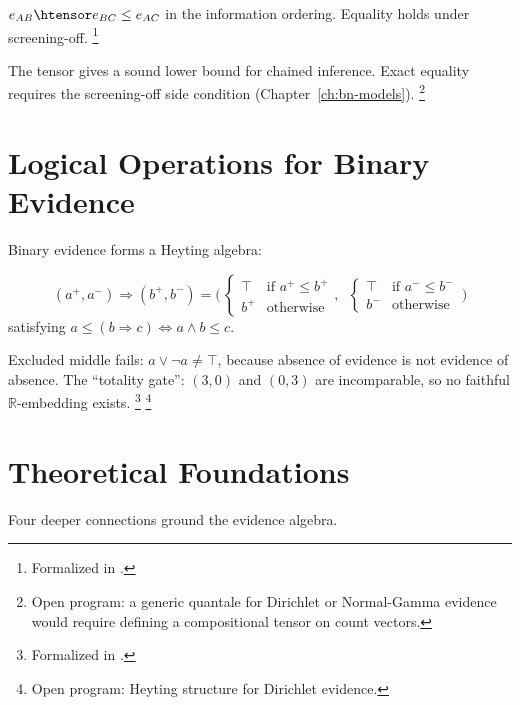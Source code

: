 \documentclass[11pt,openany]{report}
\begin{document}
\begin{theorem}
\label{thm:quantale-trans}
$e_{AB} \htensor e_{BC} \le e_{AC}$ in the information ordering.
Equality holds under screening-off.%
\footnote{Formalized in
.}
\end{theorem}

\noindent
The tensor gives a sound lower bound for chained inference.  Exact
equality requires the screening-off side condition
(Chapter~\ref{ch:bn-models}).%
\footnote{Open program: a generic quantale for Dirichlet or
Normal-Gamma evidence would require defining a compositional tensor
on count vectors.}


\section{Logical Operations for Binary Evidence}
\label{sec:binary-heyting}

Binary evidence forms a Heyting algebra:

\begin{definition}
\[
  (a^+, a^-) \Rightarrow (b^+, b^-) =
  \Big(\,\begin{cases} \top & \text{if } a^+ \le b^+ \\
                        b^+ & \text{otherwise}\end{cases},\;\;
        \begin{cases} \top & \text{if } a^- \le b^- \\
                        b^- & \text{otherwise}\end{cases}\,\Big)
\]
satisfying $a \le (b \Rightarrow c) \iff a \wedge b \le c$.
\end{definition}

\noindent
Excluded middle fails: $a \vee \neg a \ne \top$, because absence of
evidence is not evidence of absence.  The ``totality gate'':
$(3,0)$ and $(0,3)$ are incomparable, so no faithful
$\mathbb{R}$-embedding exists.%
\footnote{Formalized in
.}%
\footnote{Open program: Heyting structure for Dirichlet evidence.}


\section{Theoretical Foundations}

Four deeper connections ground the evidence algebra.
\end{document}
